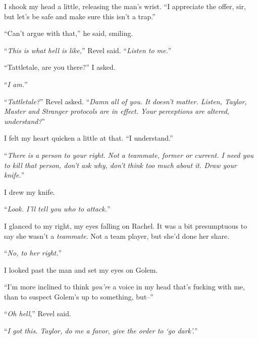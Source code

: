 I shook my head a little, releasing the man's wrist.  ``I appreciate the offer, sir, but let's be safe and make sure this isn't a trap.''



``Can't argue with that,'' he said, smiling.



``\emph{This is what hell is like,}'' Revel said.  ``\emph{Listen to me.}''



``Tattletale, are you there?''  I asked.



``\emph{I am.}''



``\emph{Tattletale?}''  Revel asked.  ``\emph{Damn all of you.  It doesn't matter.  Listen, Taylor, Master and Stranger protocols are in effect.  Your perceptions are altered, understand?}''



I felt my heart quicken a little at that.  ``I understand.''



``\emph{There is a person to your right.  Not a teammate, former or current.  I need you to kill that person, don't ask why, don't think too much about it.  Draw your knife.}''



I drew my knife.



``\emph{Look.  I'll tell you who to attack.}''



I glanced to my right, my eyes falling on Rachel.  It was a bit presumptuous to say she wasn't a \emph{teammate}.  Not a team player, but she'd done her share.



``\emph{No, to her right.}''



I looked past the man and set my eyes on Golem.



``I'm more inclined to think \emph{you're} a voice in my head that's fucking with me, than to suspect Golem's up to something, but--''



``\emph{Oh hell},'' Revel said.



``\emph{I got this.  Taylor, do me a favor, give the order to `go dark'.}''



